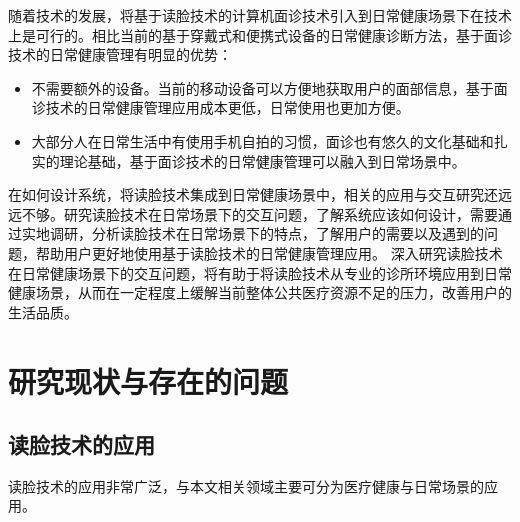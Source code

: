 

随着技术的发展，将基于读脸技术的计算机面诊技术引入到日常健康场景下在技术上是可行的。相比当前的基于穿戴式和便携式设备的日常健康诊断方法，基于面诊技术的日常健康管理有明显的优势：

\begin{itemize}
    \item 不需要额外的设备。当前的移动设备可以方便地获取用户的面部信息，基于面诊技术的日常健康管理应用成本更低，日常使用也更加方便。
    
    \item 大部分人在日常生活中有使用手机自拍的习惯，面诊也有悠久的文化基础和扎实的理论基础，基于面诊技术的日常健康管理可以融入到日常场景中。
\end{itemize}

在如何设计系统，将读脸技术集成到日常健康场景中，相关的应用与交互研究还远远不够。研究读脸技术在日常场景下的交互问题，了解系统应该如何设计，需要通过实地调研，分析读脸技术在日常场景下的特点，了解用户的需要以及遇到的问题，帮助用户更好地使用基于读脸技术的日常健康管理应用。
深入研究读脸技术在日常健康场景下的交互问题，将有助于将读脸技术从专业的诊所环境应用到日常健康场景，从而在一定程度上缓解当前整体公共医疗资源不足的压力，改善用户的生活品质。



\section{研究现状与存在的问题}


\subsection{读脸技术的应用}
读脸技术的应用非常广泛，与本文相关领域主要可分为医疗健康与日常场景的应用。

